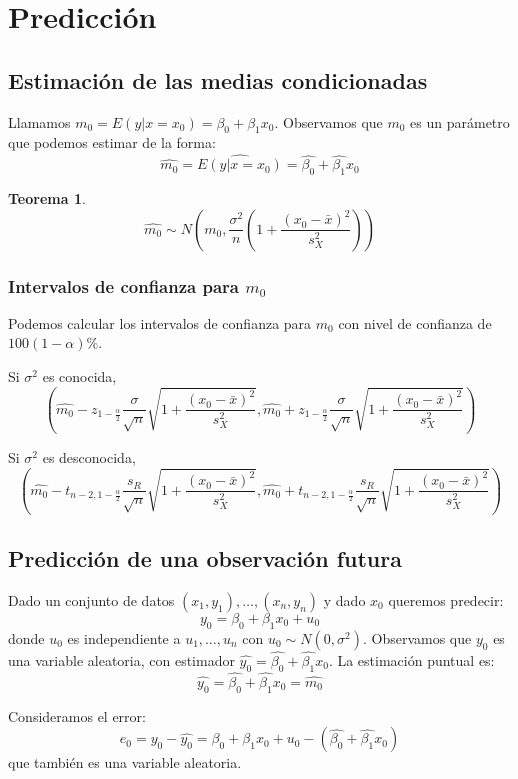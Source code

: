 \documentclass{report}
\newtheorem{theorem}{Teorema}[chapter]
\theoremstyle{remark}
\theoremstyle{remark}
\theoremstyle{remark}
\theoremstyle{definition}
\theoremstyle{definition}
\theoremstyle{definition}
\begin{document}
\section{Predicción}

\subsection*{Estimación de las medias condicionadas}
Llamamos $m_0 = E(y | x=x_0) = \beta_0 + \beta_1x_0$.
Observamos que $m_0$ es un parámetro que podemos estimar de la forma:
$$\hat{m_0} = \hat{E(y | x=x_0)} = \hat{\beta_0} + \hat{\beta_1}x_0$$

\begin{theorem}
    $$\hat{m_0} \sim N\left( m_0, \frac{\sigma^2}{n} \left(1+\frac{(x_0-\bar{x})^2}{s_X^2}\right) \right)$$
\end{theorem}

\subsubsection*{Intervalos de confianza para $m_0$}
Podemos calcular los intervalos de confianza para $m_0$ con nivel de confianza de $100(1-\alpha)\%$.

Si $\sigma^2$ es conocida,
$$\left( \hat{m_0} - z_{1-\frac{\alpha}{2}} \frac{\sigma}{\sqrt{n}} \sqrt{1 + \frac{(x_0-\bar{x})^2}{s_X^2}}, \hat{m_0} + z_{1-\frac{\alpha}{2}} \frac{\sigma}{\sqrt{n}} \sqrt{1 + \frac{(x_0-\bar{x})^2}{s_X^2}} \right)$$

Si $\sigma^2$ es desconocida,
$$\left( \hat{m_0} - t_{n-2, 1-\frac{\alpha}{2}} \frac{s_R}{\sqrt{n}} \sqrt{1 + \frac{(x_0-\bar{x})^2}{s_X^2}}, \hat{m_0} + t_{n-2, 1-\frac{\alpha}{2}} \frac{s_R}{\sqrt{n}} \sqrt{1 + \frac{(x_0-\bar{x})^2}{s_X^2}} \right)$$

\subsection*{Predicción de una observación futura}
Dado un conjunto de datos $(x_1, y_1), \dots, (x_n, y_n)$ y dado $x_0$ queremos predecir:
$$y_0 = \beta_0 + \beta_1 x_0 + u_0$$
donde $u_0$ es independiente a $u_1, \dots, u_n$ con $u_0 \sim N(0, \sigma^2)$.
Observamos que $y_0$ es una variable aleatoria, con estimador $\hat{y_0} = \hat{\beta_0} + \hat{\beta_1}x_0$.
La estimación puntual es:
$$\hat{y_0} = \hat{\beta_0} + \hat{\beta_1}x_0 = \hat{m_0}$$

Consideramos el error:
$$e_0 = y_0 - \hat{y_0} = \beta_0 + \beta_1x_0 + u_0 - (\hat{\beta_0} + \hat{\beta_1}x_0)$$
que también es una variable aleatoria.
\end{document}
